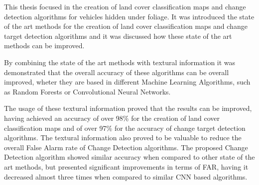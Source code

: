 This thesis focused in the creation of land cover classification maps and change detection algorithms for vehicles hidden under foliage. 
It was introduced the state of the art methods for the creation of land cover classification maps and change target detection algorithms and it was discussed how these state of the art methods can be improved.

By combining the state of the art methods with textural information it was demonstrated that the overall accuracy of these algorithms can be overall improved, wheter they are 
based in different Machine Learning Algorithms, such as Random Forests or Convolutional Neural Networks.

The usage of these textural information proved that the results can be improved, having achieved an accuracy of over 98\% for the creation of land cover classification maps and of over
97\% for the accuracy of change target detection algorithms. The textural information also proved to be valuable to reduce the overall False Alarm rate of Change Detection algorithms. The proposed Change Detection algorithm showed similar accuracy
when compared to other state of the art methods, but presented significant improvements in terms of FAR, having it decreased almost three times when compared to similar CNN based algorithms. 
